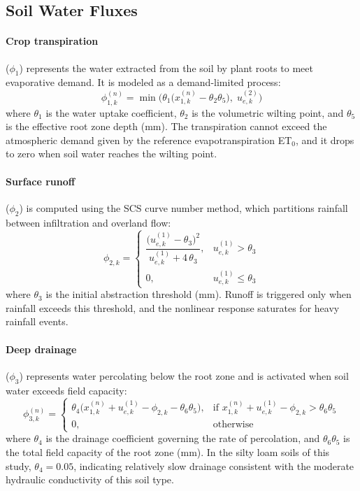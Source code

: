 \subsection{Soil Water Fluxes}
\label{sec:soil_fluxes}

\paragraph{Crop transpiration} ($\phi_1$) represents the water extracted from the soil by plant roots to meet evaporative demand. It is modeled as a demand-limited process:
\begin{equation}
    \phi_{1,k}^{(n)} = \min\!\Big(\theta_1\bigl(x_{1,k}^{(n)} - \theta_2 \theta_5\bigr),\; u_{e,k}^{(2)}\Big)
    \label{eq:phi1}
\end{equation}
where $\theta_1$ is the water uptake coefficient, $\theta_2$ is the volumetric wilting point, and $\theta_5$ is the effective root zone depth (mm). The transpiration cannot exceed the atmospheric demand given by the reference evapotranspiration ET$_0$, and it drops to zero when soil water reaches the wilting point.

\paragraph{Surface runoff} ($\phi_2$) is computed using the SCS curve number method, which partitions rainfall between infiltration and overland flow:
\begin{equation}
    \phi_{2,k} = 
    \begin{cases}
        \dfrac{\bigl(u_{e,k}^{(1)} - \theta_3\bigr)^2}{u_{e,k}^{(1)} + 4\,\theta_3}, & u_{e,k}^{(1)} > \theta_3 \\[8pt]
        0, & u_{e,k}^{(1)} \leq \theta_3
    \end{cases}
    \label{eq:phi2}
\end{equation}
where $\theta_3$ is the initial abstraction threshold (mm). Runoff is triggered only when rainfall exceeds this threshold, and the nonlinear response saturates for heavy rainfall events.

\paragraph{Deep drainage} ($\phi_3$) represents water percolating below the root zone and is activated when soil water exceeds field capacity:
\begin{equation}
    \phi_{3,k}^{(n)} = 
    \begin{cases}
        \theta_4\bigl(x_{1,k}^{(n)} + u_{e,k}^{(1)} - \phi_{2,k} - \theta_6 \theta_5\bigr), & \text{if } x_{1,k}^{(n)} + u_{e,k}^{(1)} - \phi_{2,k} > \theta_6 \theta_5 \\[4pt]
        0, & \text{otherwise}
    \end{cases}
    \label{eq:phi3}
\end{equation}
where $\theta_4$ is the drainage coefficient governing the rate of percolation, and $\theta_6 \theta_5$ is the total field capacity of the root zone (mm). In the silty loam soils of this study, $\theta_4 = 0.05$, indicating relatively slow drainage consistent with the moderate hydraulic conductivity of this soil type.

